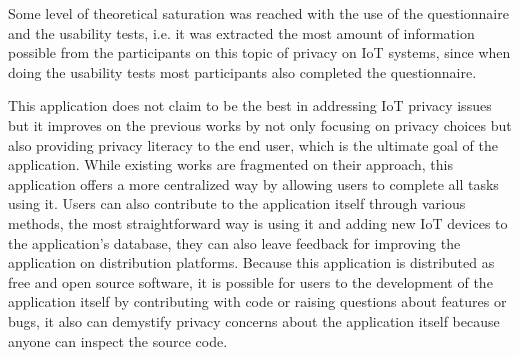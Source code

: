 Some level of theoretical saturation \cite{low2019pragmatic} was reached with the use of the questionnaire
and the usability tests, i.e. it was extracted the most amount of information
possible from the participants on this topic of privacy on IoT systems, since
when doing the usability tests most participants also completed the questionnaire.

This application does not claim to be the best in addressing IoT privacy issues but it improves
on the previous works by not only focusing on privacy choices but also
providing privacy literacy to the end user, which is the ultimate goal
of the application. While existing works are fragmented on their approach,
this application offers a more centralized way by allowing users to complete
all tasks using it. Users can also contribute to the application itself
through various methods, the most straightforward way is using it and
adding new IoT devices to the application's database, they can also leave
feedback for improving the application on distribution platforms. Because
this application is distributed as free and open source software, it
is possible for users to the development of the
application itself by contributing with code or raising questions about
features or bugs, it also
can demystify privacy concerns about the application itself because
anyone can inspect the source code.
